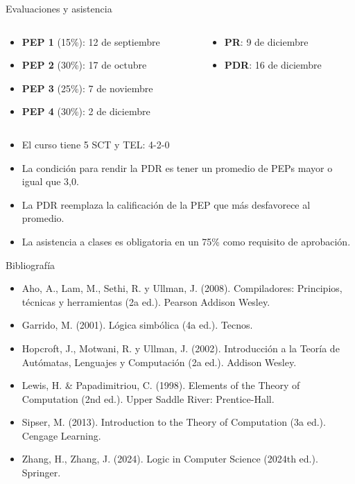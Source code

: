 \documentclass{beamer}
\begin{document}
\begin{frame}{Evaluaciones y asistencia}
  \begin{columns}
    \begin{column}{0.6\textwidth}
      \begin{itemize}
        \item \textbf{PEP 1} (15\%): 12 de septiembre
        \item \textbf{PEP 2} (30\%): 17 de octubre
        \item \textbf{PEP 3} (25\%): 7 de noviembre
        \item \textbf{PEP 4} (30\%): 2 de diciembre
      \end{itemize}
    \end{column}

    \begin{column}{0.4\textwidth}
      \begin{itemize}
        \item \textbf{PR}: 9 de diciembre
        \item \textbf{PDR}: 16 de diciembre
      \end{itemize}
    \end{column}
  \end{columns}

  \begin{itemize}[<+->]
    \vspace{0.3cm}
    \item El curso tiene 5 SCT y TEL: 4-2-0
    \item La condición para rendir la PDR es tener un promedio de PEPs mayor o
          igual que 3,0.
    \item La PDR reemplaza la calificación de la PEP que más desfavorece al
          promedio.
    \item La asistencia a clases es obligatoria en un 75\% como requisito de
          aprobación.
  \end{itemize}
\end{frame}


\begin{frame}{Bibliografía}
  \begin{itemize}
    \item Aho, A., Lam, M., Sethi, R. y Ullman, J. (2008). Compiladores:
          Principios, técnicas y herramientas (2a ed.). Pearson Addison Wesley.
    \item Garrido, M. (2001). Lógica simbólica (4a ed.). Tecnos.
    \item Hopcroft, J., Motwani, R. y Ullman, J. (2002). Introducción a la
          Teoría de Autómatas, Lenguajes y Computación (2a ed.). Addison Wesley.
    \item Lewis, H. \& Papadimitriou, C. (1998). Elements of the Theory of
          Computation (2nd ed.). Upper Saddle River: Prentice-Hall.
    \item Sipser, M. (2013). Introduction to the Theory of Computation (3a ed.).
          Cengage Learning.
    \item Zhang, H., Zhang, J. (2024). Logic in Computer Science (2024th ed.).
          Springer.
  \end{itemize}
\end{frame}
\end{document}
